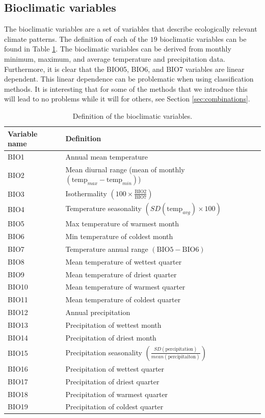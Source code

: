 \subsection{Bioclimatic variables}
The bioclimatic variables are a set of variables that describe ecologically relevant climate patterns.  The definition of each of the $19$ bioclimatic variables can be found in Table \ref{table:Bioclim}. The bioclimatic variables can be derived from monthly minimum, maximum, and average temperature and precipitation data. Furthermore, it is clear that the BIO05, BIO6, and BIO7 variables are linear dependent. This linear dependence can be problematic when using classification methods. It is interesting that for some of the methods that we introduce this will lead to no problems while it will for others, see Section \ref{sec:combinations}. \\ 

\begin{table}[htb]
\centering
\begin{tabular}{ll}
\toprule
Variable name & Definition \\ 
\midrule
BIO1 & Annual mean temperature \\
BIO2 & Mean diurnal range (mean of monthly $\left( \text{temp}_{max} - \text{temp}_{min} \right)$) \\
BIO3 & Isothermality $\left( 100 \times \frac{\text{BIO2}}{\text{BIO7}} \right)$  \\
BIO4 & Temperature seasonality $\left(SD(\text{temp}_{avg}) \times 100\right)$ \\
BIO5 & Max temperature of warmest month \\
BIO6 & Min temperature of coldest month \\
BIO7 & Temperature annual range $\left(\text{BIO5} - \text{BIO6}\right)$ \\
BIO8 & Mean temperature of wettest quarter \\
BIO9 & Mean temperature of driest quarter \\
BIO10 & Mean temperature of warmest quarter \\
BIO11 & Mean temperature of coldest quarter \\
BIO12 & Annual precipitation \\
BIO13 & Precipitation of wettest month \\
BIO14 & Precipitation of driest month \\
BIO15 & Precipitation seasonality $\left( \frac{SD( \text{percipitation})}{mean(\text{percipitaiton})} \right)$ \\
BIO16 & Precipitation of wettest quarter \\
BIO17 & Precipitation of driest quarter \\
BIO18 & Precipitation of warmest quarter \\
BIO19 & Precipitation of coldest quarter \\
\bottomrule
\end{tabular}
\caption{\label{table:Bioclim}Definition of the bioclimatic variables.}
\end{table}

